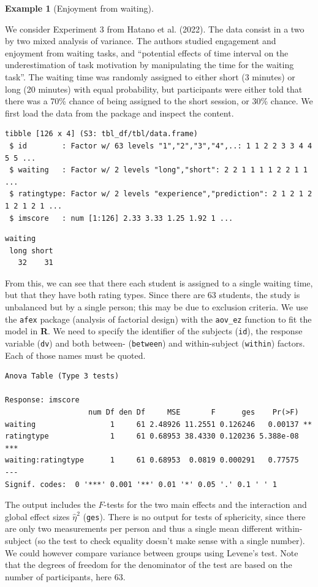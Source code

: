 \documentclass[
  11pt,
  letterpaper,
]{scrbook}
\theoremstyle{definition}
\newtheorem{example}{Example}[chapter]
\theoremstyle{definition}
\theoremstyle{remark}
\begin{document}
\begin{example}[Enjoyment from
waiting]\protect\hypertarget{exm-waiting}{}\label{exm-waiting}

We consider Experiment 3 from Hatano et al. (2022). The data consist in
a two by two mixed analysis of variance. The authors studied engagement
and enjoyment from waiting tasks, and ``potential effects of time
interval on the underestimation of task motivation by manipulating the
time for the waiting task''. The waiting time was randomly assigned to
either short (3 minutes) or long (20 minutes) with equal probability,
but participants were either told that there was a 70\% chance of being
assigned to the short session, or 30\% chance. We first load the data
from the package and inspect the content.

\begin{verbatim}
tibble [126 x 4] (S3: tbl_df/tbl/data.frame)
 $ id        : Factor w/ 63 levels "1","2","3","4",..: 1 1 2 2 3 3 4 4 5 5 ...
 $ waiting   : Factor w/ 2 levels "long","short": 2 2 1 1 1 1 2 2 1 1 ...
 $ ratingtype: Factor w/ 2 levels "experience","prediction": 2 1 2 1 2 1 2 1 2 1 ...
 $ imscore   : num [1:126] 2.33 3.33 1.25 1.92 1 ...
\end{verbatim}

\begin{verbatim}
waiting
 long short 
   32    31 
\end{verbatim}

From this, we can see that there each student is assigned to a single
waiting time, but that they have both rating types. Since there are 63
students, the study is unbalanced but by a single person; this may be
due to exclusion criteria. We use the \texttt{afex} package (analysis of
factorial design) with the \texttt{aov\_ez} function to fit the model in
\textbf{R}. We need to specify the identifier of the subjects
(\texttt{id}), the response variable (\texttt{dv}) and both between-
(\texttt{between}) and within-subject (\texttt{within}) factors. Each of
those names must be quoted.

\begin{verbatim}
Anova Table (Type 3 tests)

Response: imscore
                   num Df den Df     MSE       F      ges    Pr(>F)    
waiting                 1     61 2.48926 11.2551 0.126246   0.00137 ** 
ratingtype              1     61 0.68953 38.4330 0.120236 5.388e-08 ***
waiting:ratingtype      1     61 0.68953  0.0819 0.000291   0.77575    
---
Signif. codes:  0 '***' 0.001 '**' 0.01 '*' 0.05 '.' 0.1 ' ' 1
\end{verbatim}

The output includes the \(F\)-tests for the two main effects and the
interaction and global effect sizes \(\widehat{\eta}^2\) (\texttt{ges}).
There is no output for tests of sphericity, since there are only two
measurements per person and thus a single mean different within-subject
(so the test to check equality doesn't make sense with a single number).
We could however compare variance between groups using Levene's test.
Note that the degrees of freedom for the denominator of the test are
based on the number of participants, here 63.

\end{example}
\end{document}
